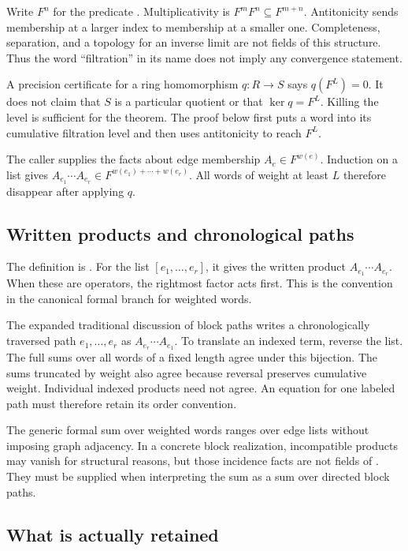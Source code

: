 Write $F^n$ for the predicate . Multiplicativity is $F^mF^n\subseteq F^{m+n}$. Antitonicity sends membership at a larger index to membership at a smaller one. Completeness, separation, and a topology for an inverse limit are not fields of this structure. Thus the word ``filtration'' in its name does not imply any convergence statement.

A precision certificate for a ring homomorphism $q:R\to S$ says $q(F^L)=0$. It does not claim that $S$ is a particular quotient or that $\ker q=F^L$. Killing the level is sufficient for the theorem. The proof below first puts a word into its cumulative filtration level and then uses antitonicity to reach $F^L$.

The caller supplies the facts about edge membership $A_e\in F^{w(e)}$. Induction on a list gives $A_{e_1}\cdots A_{e_r}\in F^{w(e_1)+\cdots+w(e_r)}$. All words of weight at least $L$ therefore disappear after applying $q$.

\subsection{Written products and chronological paths}

The definition  is . For the list $[e_1,\ldots,e_r]$, it gives the written product $A_{e_1}\cdots A_{e_r}$. When these are operators, the rightmost factor acts first. This is the convention in the canonical formal branch for weighted words.

The expanded traditional discussion of block paths writes a chronologically traversed path $e_1,\ldots,e_r$ as $A_{e_r}\cdots A_{e_1}$. To translate an indexed term, reverse the list. The full sums over all words of a fixed length agree under this bijection. The sums truncated by weight also agree because reversal preserves cumulative weight. Individual indexed products need not agree. An equation for one labeled path must therefore retain its order convention.

The generic formal sum over weighted words ranges over edge lists without imposing graph adjacency. In a concrete block realization, incompatible products may vanish for structural reasons, but those incidence facts are not fields of . They must be supplied when interpreting the sum as a sum over directed block paths.

\subsection{What is actually retained}


